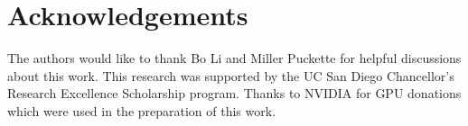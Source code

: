 \documentclass[a4paper]{article}
\begin{document}
\section{Acknowledgements}

The authors would like to thank Bo Li and Miller Puckette for helpful discussions about this work. 
This research was supported by the UC San Diego Chancellor’s Research Excellence Scholarship program.
Thanks to NVIDIA for GPU donations which were used in the preparation of this work.





\end{document}
